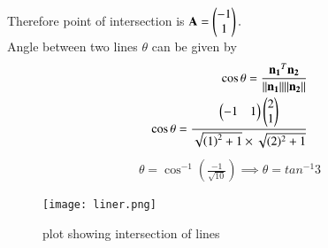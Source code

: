 \documentclass[journal,12pt,twocolumn]{IEEEtran}
\begin{document}
Therefore point of intersection is $\mathbf{A}=\begin{pmatrix}-1\\1\end{pmatrix}.$
\\
Angle between two lines $\theta$ can be given by
\begin{align}
\cos\theta =\frac{\mathbf{n_1}^T\mathbf{n_2}}{\lVert\mathbf{n_1}\rVert\lVert\mathbf{n_2}\rVert}\\
 \cos\theta=\frac{\begin{pmatrix}-1&1\end{pmatrix}\begin{pmatrix}2\\1\end{pmatrix}}{\sqrt{\left(1\right)^2 +1} \times \sqrt{(2)^2 +1}}
\end{align}
\begin{align}
\theta = \cos^{-1}(\frac{-1}{\sqrt{10}})\implies \theta = tan^{-1}3
\end{align}
\begin{figure}[!ht]
\centering
\texttt{[image: liner.png]}
\caption{plot showing intersection of lines}
\label{Fig}
\end{figure}
\end{document}
